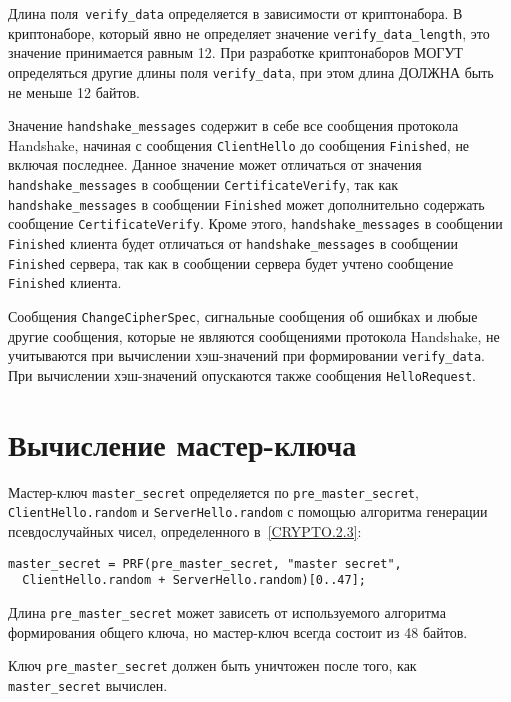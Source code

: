 Длина поля~\lstinline{verify_data} определяется в зависимости от
криптонабора. В криптонаборе, который явно не определяет значение
\lstinline{verify_data_length}, это значение принимается равным 12. При
разработке криптонаборов МОГУТ определяться другие длины поля
\lstinline{verify_data}, при этом длина ДОЛЖНА быть не меньше 12 байтов.

Значение \lstinline{handshake_messages} содержит в себе все сообщения
протокола Handshake, начиная с сообщения \lstinline{ClientHello} до
сообщения \lstinline{Finished}, не включая последнее. Данное значение может
отличаться от значения \lstinline{handshake_messages} в сообщении
\lstinline{CertificateVerify}, так как \lstinline{handshake_messages} в
сообщении \lstinline{Finished} может дополнительно содержать сообщение
\lstinline{CertificateVerify}. Кроме этого, \lstinline{handshake_messages}
в сообщении \lstinline{Finished} клиента будет отличаться от
\lstinline{handshake_messages} в сообщении \lstinline{Finished} сервера,
так как в сообщении сервера будет  учтено сообщение \lstinline{Finished}
клиента.

Сообщения \lstinline{ChangeCipherSpec}, сигнальные сообщения об ошибках и
любые другие сообщения, которые не являются сообщениями протокола
Handshake, не учитываются при вычислении хэш-значений при
формировании \lstinline{verify_data}. При вычислении хэш-значений
опускаются также сообщения \lstinline{HelloRequest}.

\section{Вычисление мастер-ключа}\label{HANDSHAKE.16}

Мастер-ключ \lstinline{master_secret} определяется по
\lstinline{pre_master_secret}, \lstinline{ClientHello.random} и
\lstinline{ServerHello.random} с помощью алгоритма генерации
псевдослучайных чисел, определенного в~\ref{CRYPTO.2.3}:
\begin{lstlisting}
master_secret = PRF(pre_master_secret, "master secret",
  ClientHello.random + ServerHello.random)[0..47];
\end{lstlisting}

Длина \lstinline{pre_master_secret} может зависеть от используемого алгоритма 
формирования общего ключа, но мастер-ключ всегда состоит из 48 байтов. 

Ключ \lstinline{pre_master_secret} должен быть уничтожен после того, как 
\lstinline{master_secret} вычислен. 



